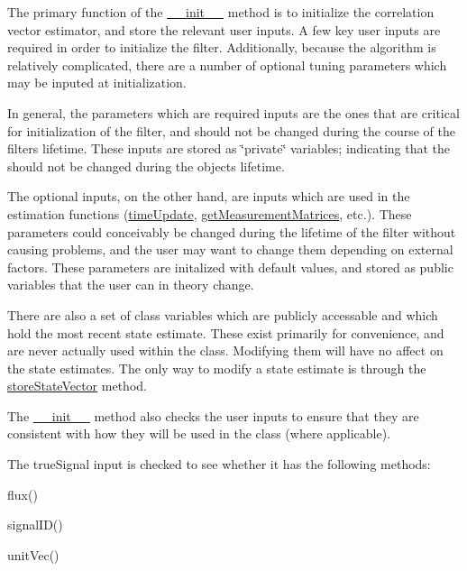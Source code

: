 The primary function of the \hyperlink{classmodest_1_1substates_1_1correlationvector_1_1CorrelationVector_ab344abe2451cdb5e476960cd3745eb62}{\+\_\+\+\_\+init\+\_\+\+\_\+} method is to initialize the correlation vector estimator, and store the relevant user inputs. A few key user inputs are required in order to initialize the filter. Additionally, because the algorithm is relatively complicated, there are a number of optional tuning parameters which may be inputed at initialization.

In general, the parameters which are required inputs are the ones that are critical for initialization of the filter, and should not be changed during the course of the filter\textquotesingle{}s lifetime. These inputs are stored as \char`\"{}private\char`\"{} variables; indicating that the should not be changed during the object\textquotesingle{}s lifetime.

The optional inputs, on the other hand, are inputs which are used in the estimation functions (\hyperlink{classmodest_1_1substates_1_1correlationvector_1_1CorrelationVector_a59c13e5fa26ba27717494f687ec78ef8}{time\+Update}, \hyperlink{classmodest_1_1substates_1_1correlationvector_1_1CorrelationVector_a2fb13d8c6fffa49ee641dd918a64db4b}{get\+Measurement\+Matrices}, etc.). These parameters could conceivably be changed during the lifetime of the filter without causing problems, and the user may want to change them depending on external factors. These parameters are initalized with default values, and stored as public variables that the user can in theory change.

There are also a set of class variables which are publicly accessable and which hold the most recent state estimate. These exist primarily for convenience, and are never actually used within the class. Modifying them will have no affect on the state estimates. The only way to modify a state estimate is through the \hyperlink{classmodest_1_1substates_1_1correlationvector_1_1CorrelationVector_a70ed47697f09424e62e52133fdfb59de}{store\+State\+Vector} method.

The \hyperlink{classmodest_1_1substates_1_1correlationvector_1_1CorrelationVector_ab344abe2451cdb5e476960cd3745eb62}{\+\_\+\+\_\+init\+\_\+\+\_\+} method also checks the user inputs to ensure that they are consistent with how they will be used in the class (where applicable).

The true\+Signal input is checked to see whether it has the following methods\+:
\begin{DoxyItemize}
\item flux()
\item signal\+I\+D()
\item unit\+Vec()
\end{DoxyItemize}


